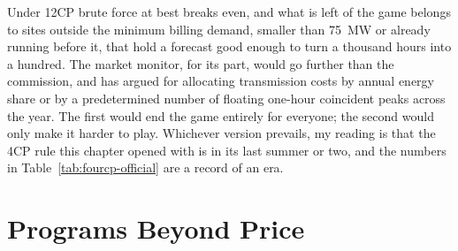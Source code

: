Under 12CP brute force at best breaks even, and what is left of the game belongs to sites outside the minimum billing demand, smaller than 75~MW or already running before it, that hold a forecast good enough to turn a thousand hours into a hundred. The market monitor, for its part, would go further than the commission, and has argued for allocating transmission costs by annual energy share or by a predetermined number of floating one-hour coincident peaks across the year. The first would end the game entirely for everyone; the second would only make it harder to play. %
Whichever version prevails, my reading is that the 4CP rule this chapter opened with is in its last summer or two, and the numbers in Table~\ref{tab:fourcp-official} are a record of an era.

\section{Programs Beyond Price}
\label{sec:programs}

